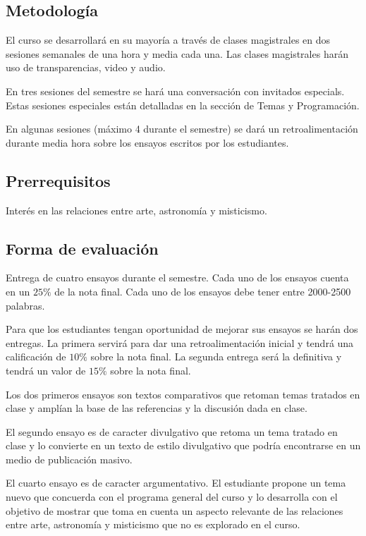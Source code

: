 \documentclass{report}
\begin{document}
\subsection*{Metodolog\'ia}

El curso se desarrollar\'a en su mayor\'ia a trav\'es de clases
magistrales en dos sesiones semanales de una hora y media cada
una. Las clases magistrales har\'an uso de transparencias, video y
audio. 

En tres sesiones del semestre se har\'a una conversaci\'on con
invitados especials. Estas sesiones especiales est\'an detalladas en
la secci\'on de Temas y Programaci\'on.  

En algunas sesiones (m\'aximo 4 durante el semestre) se dar\'a un
retroalimentaci\'on durante media hora sobre los ensayos escritos por los
estudiantes. 

\subsection*{Prerrequisitos}
Inter\'es en las relaciones entre arte, astronom\'ia y misticismo.

\subsection*{Forma de evaluaci\'on}

Entrega de cuatro ensayos durante el semestre. Cada uno de los ensayos
cuenta en un $25 \%$ de la nota final. Cada uno de los ensayos debe
tener entre 2000-2500 palabras. 

Para que los estudiantes tengan oportunidad de mejorar sus ensayos se
har\'an dos entregas. La primera servir\'a para dar una
retroalimentaci\'on inicial y tendr\'a una calificaci\'on de $10\%$ sobre la
nota final. La segunda entrega ser\'a la definitiva y tendr\'a un
valor de $15\%$ sobre la nota final. 

Los dos primeros ensayos son textos comparativos que retoman temas
tratados en clase y ampl\'ian la base de las referencias y la
discusi\'on dada en clase.

El segundo ensayo es de caracter divulgativo que retoma un
tema tratado en clase y lo convierte en un texto de estilo divulgativo
que podr\'ia encontrarse en un medio de publicaci\'on masivo.

El cuarto ensayo es de caracter argumentativo. El estudiante propone
un tema nuevo que concuerda con el programa general del curso y lo
desarrolla con el objetivo de mostrar que toma en cuenta un aspecto
relevante de las relaciones entre arte, astronom\'ia y misticismo que
no es explorado en el curso.
\end{document}
